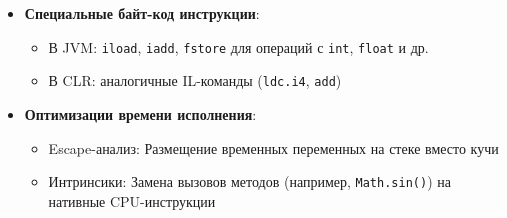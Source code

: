 \begin{itemize}
    \item \textbf{Специальные байт-код инструкции}:
    \begin{itemize}
        \item В JVM: \texttt{iload}, \texttt{iadd}, \texttt{fstore} для операций с \texttt{int}, \texttt{float} и др.
        \item В CLR: аналогичные IL-команды (\texttt{ldc.i4}, \texttt{add})
    \end{itemize}

    \item \textbf{Оптимизации времени исполнения}:
    \begin{itemize}
        \item Escape-анализ: Размещение временных переменных на стеке вместо кучи
        \item Интринсики: Замена вызовов методов (например, \texttt{Math.sin()}) на нативные CPU-инструкции
    \end{itemize}
\end{itemize}
